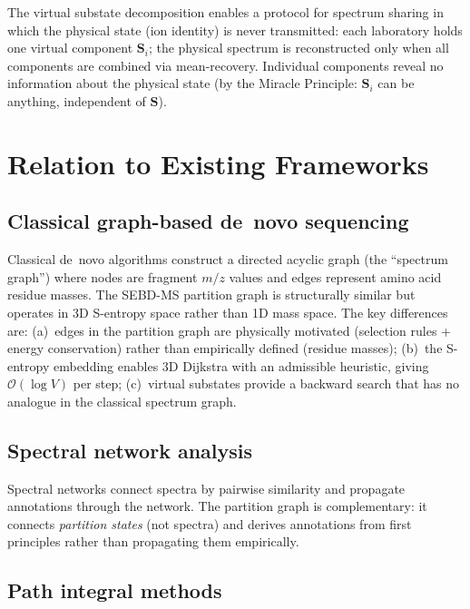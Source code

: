 \documentclass[twocolumn,10pt,a4paper]{article}
\theoremstyle{thmstyle}
\theoremstyle{definition}
\theoremstyle{remark}
\newcommand{\Sv}{\mathbf{S}}
\begin{document}
The virtual substate decomposition enables a protocol for spectrum sharing
in which the physical state (ion identity) is never transmitted:
each laboratory holds one virtual component $\Sv_i$; the physical
spectrum is reconstructed only when all components are combined via
mean-recovery. Individual components reveal no information about the
physical state (by the Miracle Principle: $\Sv_i$ can be anything,
independent of $\Sv$).

\section{Relation to Existing Frameworks}
\label{sec:relation}

\subsection{Classical graph-based de~novo sequencing}

Classical de~novo algorithms \citep{frank2005, ma2003} construct a
directed acyclic graph (the ``spectrum graph'') where nodes are fragment
$m/z$ values and edges represent amino acid residue masses. The SEBD-MS
partition graph is structurally similar but operates in 3D S-entropy
space rather than 1D mass space. The key differences are:
(a)~edges in the partition graph are physically motivated (selection
rules + energy conservation) rather than empirically defined (residue
masses); (b)~the S-entropy embedding enables 3D Dijkstra with an
admissible heuristic, giving $\mathcal{O}(\log V)$ per step;
(c)~virtual substates provide a backward search that has no analogue
in the classical spectrum graph.

\subsection{Spectral network analysis}

Spectral networks \citep{bandeira2007} connect spectra by pairwise
similarity and propagate annotations through the network. The partition
graph is complementary: it connects \emph{partition states} (not spectra)
and derives annotations from first principles rather than propagating
them empirically.

\subsection{Path integral methods}
\end{document}
